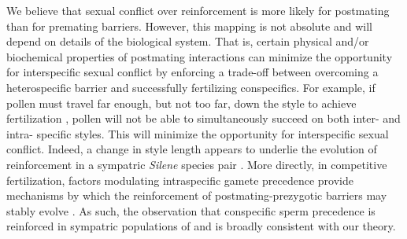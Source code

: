 \documentclass[11pt]{article}
\begin{document}
We believe that sexual conflict over reinforcement is more likely for postmating than for premating barriers. 
However, this mapping is not absolute and will depend on details of the biological system.   
That is, certain physical and/or biochemical properties of postmating interactions can minimize the opportunity for interspecific sexual conflict by enforcing a trade-off between overcoming a heterospecific barrier and successfully fertilizing conspecifics.    
For example, if pollen must travel far enough, but not too far, down the style to achieve fertilization \citep[as observed in interspecific crosses in Nicotiana ][]{lee2008}, pollen will not be able to simultaneously succeed on both inter- and intra- specific styles.
This will minimize the opportunity for interspecific sexual conflict.  
Indeed, a change in style length appears to underlie the evolution of reinforcement in a sympatric \textit{Silene} species pair \citep{nista2015}.  
More directly, in competitive fertilization, factors modulating intraspecific gamete precedence provide mechanisms by which the reinforcement of postmating-prezygotic barriers may stably evolve \citep{howard1993,lorch2007}.   
As such, the observation that conspecific sperm precedence is reinforced in sympatric populations of \citep{Drosophila pseudoobscura}  and \citep{D. persimilis} \citep{castillo2018} is broadly consistent with our theory.  




\end{document}
